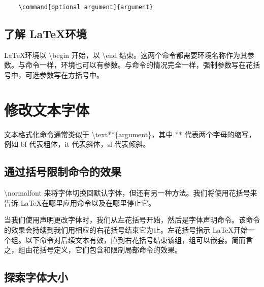 \begin{verbatim}
    \command[optional argument]{argument}
\end{verbatim}
\subsection{了解 \LaTeX 环境}
\LaTeX 环境以 \textbackslash begin 开始，以 \textbackslash end 结束。这两个命令都需要环境名称作为其参数。与命令一样，环境也可以有参数。与命令的情况完全一样，强制参数写在花括号中，可选参数写在方括号中。
\section{修改文本字体}
文本格式化命令通常类似于 \textbackslash text**\{argument\}，其中 ** 代表两个字母的缩写，例如 bf 代表粗体，it 代表斜体，sl 代表倾斜。
\subsection{通过括号限制命令的效果}
\textbackslash normalfont 来将字体切换回默认字体，但还有另一种方法。我们将使用花括号来告诉 \LaTeX 在哪里应用命令以及在哪里停止它。

当我们使用声明更改字体时，我们从左花括号开始，然后是字体声明命令。该命令的效果会持续到我们用相应的右花括号结束它为止。左花括号指示 \LaTeX 开始一个组。以下命令对后续文本有效，直到右花括号结束该组，组可以嵌套。简而言之，组由花括号定义，它们包含和限制局部命令的效果。

\subsection{探索字体大小}